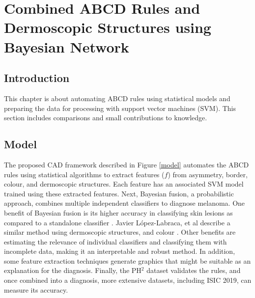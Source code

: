 \chapter{Combined ABCD Rules and Dermoscopic Structures using Bayesian Network}

\section{Introduction}
This chapter is about automating ABCD rules using statistical models and preparing the data for processing with support vector machines (SVM). This section includes comparisons and small contributions to knowledge.

\section{Model}
The proposed CAD framework described in Figure \ref{model} automates the ABCD rules using statistical algorithms to extract features ($f$) from asymmetry, border, colour, and dermoscopic structures. Each feature has an associated SVM model trained using these extracted features. Next, Bayesian fusion, a probabilistic approach, combines multiple independent classifiers to diagnose melanoma. One benefit of Bayesian fusion is its higher accuracy in classifying skin lesions as compared to a standalone classifier \cite{Takruri2017}.  Javier López-Labraca, et al describe a similar method using dermoscopic structures, and colour \cite{Lopez-Labraca2018}. Other benefits are estimating the relevance of individual classifiers and classifying them with incomplete data, making it an interpretable and robust method. In addition, some feature extraction techniques generate graphics that might be suitable as an explanation for the diagnosis. Finally, the PH$^2$ dataset validates the rules, and once combined into a diagnosis, more extensive datasets, including ISIC 2019, can measure its accuracy.

